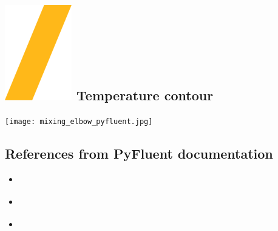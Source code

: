 \documentclass[9pt,landscape]{article}
\begin{document}
\begin{multicols}{3}
\section{\includegraphics[height=\fontcharht\font`\S]{slash.png}  Temperature contour}
\texttt{[image: mixing\_elbow\_pyfluent.jpg]}
\centering


\subsection{References from PyFluent documentation}
\begin{itemize}
\item \href{https://fluent.docs.pyansys.com/version/stable/getting_started/index.html}{\color{blue}{Getting started}}  
\item \href{https://fluent.docs.pyansys.com/version/stable/api/solver/settings.html#ref-settings}{\color{blue}{Solver settings objects}}
\item \href{https://fluent.docs.pyansys.com/version/stable/examples/index.html}{\color{blue}{Examples}}
\end{itemize}
\end{multicols}
\end{document}

